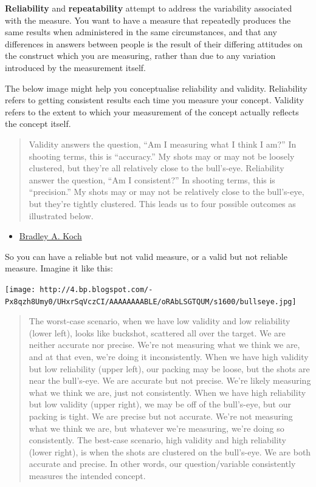 \documentclass[]{book}
\providecommand{\tightlist}{%
  \setlength{\itemsep}{0pt}\setlength{\parskip}{0pt}}
\theoremstyle{definition}
\theoremstyle{definition}
\theoremstyle{definition}
\theoremstyle{remark}
\begin{document}
\textbf{Reliability} and \textbf{repeatability} attempt to address the
variability associated with the measure. You want to have a measure that
repeatedly produces the same results when administered in the same
circumstances, and that any differences in answers between people is the
result of their differing attitudes on the construct which you are
measuring, rather than due to any variation introduced by the
measurement itself.

The below image might help you conceptualise reliability and validity.
Reliability refers to getting consistent results each time you measure
your concept. Validity refers to the extent to which your measurement of
the concept actually reflects the concept itself.

\begin{quote}
Validity answers the question, ``Am I measuring what I think I am?'' In
shooting terms, this is ``accuracy.'' My shots may or may not be loosely
clustered, but they're all relatively close to the bull's-eye.
Reliability answer the question, ``Am I consistent?'' In shooting terms,
this is ``precision.'' My shots may or may not be relatively close to
the bull's-eye, but they're tightly clustered. This leads us to four
possible outcomes as illustrated below.
\end{quote}

\begin{itemize}
\tightlist
\item
  \href{http://www.socingoutloud.com/2012/10/teaching-validity-and-reliability-in.html}{Bradley
  A. Koch}
\end{itemize}

So you can have a reliable but not valid measure, or a valid but not
reliable measure. Imagine it like this:

\texttt{[image: http://4.bp.blogspot.com/-Px8qzh8Umy0/UHxrSqVczCI/AAAAAAAABLE/oRAbLSGTQUM/s1600/bullseye.jpg]}

\begin{quote}
The worst-case scenario, when we have low validity and low reliability
(lower left), looks like buckshot, scattered all over the target. We are
neither accurate nor precise. We're not measuring what we think we are,
and at that even, we're doing it inconsistently. When we have high
validity but low reliability (upper left), our packing may be loose, but
the shots are near the bull's-eye. We are accurate but not precise.
We're likely measuring what we think we are, just not consistently. When
we have high reliability but low validity (upper right), we may be off
of the bull's-eye, but our packing is tight. We are precise but not
accurate. We're not measuring what we think we are, but whatever we're
measuring, we're doing so consistently. The best-case scenario, high
validity and high reliability (lower right), is when the shots are
clustered on the bull's-eye. We are both accurate and precise. In other
words, our question/variable consistently measures the intended concept.
\end{quote}
\end{document}
